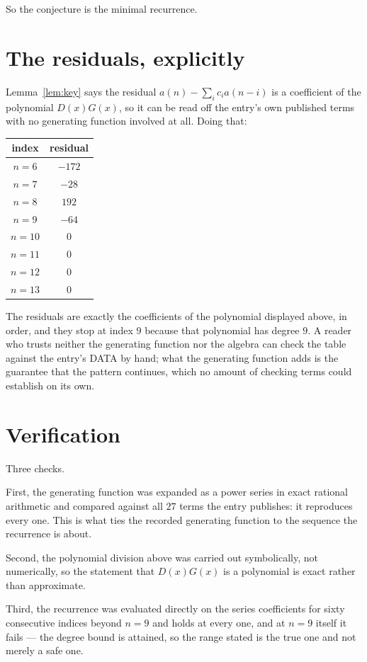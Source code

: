 \documentclass[11pt,a4paper]{article}
\theoremstyle{plain}
\theoremstyle{definition}
\begin{document}
So the conjecture is the minimal recurrence.

\section{The residuals, explicitly}

Lemma~\ref{lem:key} says the residual $a(n)-\sum_ic_ia(n-i)$ is a coefficient of the
polynomial $D(x)G(x)$, so it can be read off the entry's own published terms with no
generating function involved at all. Doing that:
\begin{center}
\begin{tabular}{cc}
index & residual \\ \hline
$n=6$ & $-172$ \\
$n=7$ & $-28$ \\
$n=8$ & $192$ \\
$n=9$ & $-64$ \\
$n=10$ & $0$ \\
$n=11$ & $0$ \\
$n=12$ & $0$ \\
$n=13$ & $0$
\end{tabular}
\end{center}
The residuals are exactly the coefficients of the polynomial displayed above, in order, and
they stop at index $9$ because that polynomial has degree $9$. A reader who trusts
neither the generating function nor the algebra can check the table against the entry's DATA
by hand; what the generating function adds is the guarantee that the pattern continues, which
no amount of checking terms could establish on its own.

\section{Verification}

Three checks.

First, the generating function was expanded as a power series in exact rational arithmetic and
compared against all $27$ terms the entry publishes: it reproduces every one. This is
what ties the recorded generating function to the sequence the recurrence is about.

Second, the polynomial division above was carried out symbolically, not numerically, so the
statement that $D(x)G(x)$ is a polynomial is exact rather than approximate.

Third, the recurrence was evaluated directly on the series coefficients for sixty consecutive
indices beyond $n=9$ and holds at every one, and at $n=9$ itself it fails --- the
degree bound is attained, so the range stated is the true one and not merely a safe one.
\end{document}
